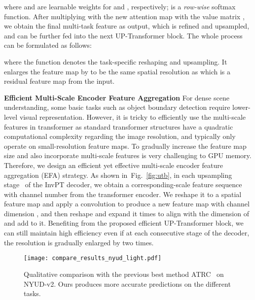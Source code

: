 \documentclass[runningheads]{llncs}
\begin{document}
where  and  are learnable weights for  and , respectively;
 is a \emph{row-wise} softmax function. After multiplying with the new attention map  with the value matrix , we obtain the final multi-task feature  as output, which is refined and upsampled, and can be further fed into the next UP-Transformer block. The whole process can be formulated as follows:

where the function  denotes the task-specific reshaping and upsampling. It enlarges the feature map by  to be the same spatial resolution as  which is a residual feature map from the input.

\par\noindent\textbf{Efficient Multi-Scale Encoder Feature Aggregation}
For dense scene understanding, some basic tasks such as object boundary detection require lower-level visual representation. However, it is tricky to efficiently use the multi-scale features in transformer as standard transformer structures have a quadratic computational complexity regarding the image resolution, and typically only operate on small-resolution feature maps. To gradually increase the feature map size and also incorporate multi-scale features is very challenging to GPU memory.
Therefore, we design an efficient yet effective multi-scale encoder feature aggregation (EFA) strategy. As shown in~Fig.~\ref{fig:utb},
in each upsampling stage~ of the InvPT decoder, we obtain a corresponding-scale feature sequence  with channel number  from the transformer encoder. We reshape it to a spatial feature map and apply a  convolution to produce a new feature map with channel dimension , and then reshape and expand it  times to align with the dimension of  and add to it. Benefiting from the proposed efficient UP-Transformer block, we can still maintain high efficiency even if at each consecutive stage of the decoder, the resolution is gradually enlarged by two times.


\begin{figure}[!t]
	\centering
	\vspace{-5pt}
	\texttt{[image: compare\_results\_nyud\_light.pdf]}
	\vspace{-0.8em}	
	\caption{Qualitative comparison with the previous best method ATRC~\cite{atrc} on NYUD-v2. Ours produces more accurate predictions on the different tasks.
	}
	\vspace{-20pt}
	\label{fig:qualitative_sota_nyud}
\end{figure}

\vspace{-10pt}
\end{document}
